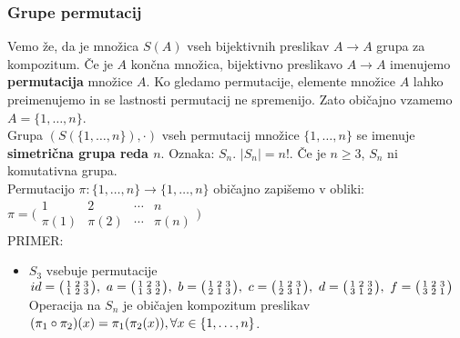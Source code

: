 \documentclass[a4paper,12pt]{article}
\begin{document}
\newpage 

\begin{center}
\subsubsection{Grupe permutacij}
\end{center}

\noindent Vemo že, da je množica $S(A)$ vseh bijektivnih preslikav $A\rightarrow A$ grupa za kompozitum. Če je $A$ končna množica, bijektivno preslikavo $A \rightarrow A$ imenujemo \textbf{permutacija} množice $A$. Ko gledamo permutacije, elemente množice $A$ lahko preimenujemo in se lastnosti permutacij ne spremenijo. Zato običajno vzamemo $A=\{ 1,\ldots,n \}$. \\

\noindent Grupa $(S(\{ 1,\ldots,n\}),\cdot)$ vseh permutacij množice $\{1,\ldots,n \}$ se imenuje \textbf{simetrična grupa reda $n$}. Oznaka: $S_n$. $|S_n|=n!$. Če je $n \geq 3$, $S_n$ ni komutativna grupa. \\

\noindent Permutacijo $\pi: \{1,\ldots,n \} \rightarrow \{1,\ldots,n\}$ običajno zapišemo v obliki: 
$\pi = \bigl(
\begin{smallmatrix}
1 & 2 & \cdots & n \\
\pi(1) & \pi(2) & \cdots & \pi(n)
\end{smallmatrix}\bigr) $ \\

\noindent PRIMER: 
\begin{itemize}
\item $S_3$ vsebuje permutacije 
$id=\bigl(
\begin{smallmatrix}
1 & 2 & 3 \\
1 & 2 & 3
\end{smallmatrix}\bigr), 
~ a=\bigl(
\begin{smallmatrix}
1 & 2 & 3 \\
1 & 3 & 2
\end{smallmatrix}\bigr),
~ b=\bigl(
\begin{smallmatrix}
1 & 2 & 3 \\
2 & 1 & 3
\end{smallmatrix}\bigr),
~ c=\bigl(
\begin{smallmatrix}
1 & 2 & 3 \\
2 & 3 & 1
\end{smallmatrix}\bigr), \linebreak
~ d=\bigl(
\begin{smallmatrix}
1 & 2 & 3 \\
3 & 1 & 2
\end{smallmatrix}\bigr),
~ f=\bigl(
\begin{smallmatrix}
1 & 2 & 3 \\
3 & 2 & 1
\end{smallmatrix}\bigr) $ \\

Operacija na $S_n$ je običajen kompozitum preslikav $(\pi_1 \circ \pi_2)(x)=\pi_1(\pi_2(x)), \linebreak \forall x \in \{ 1,\ldots,n \}$. \\
\end{itemize}
\end{document}
